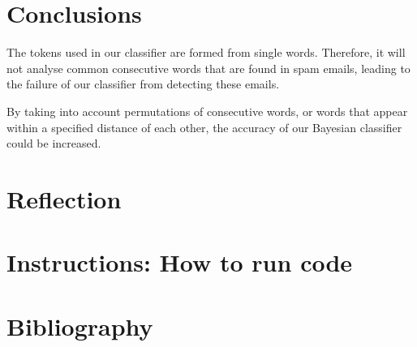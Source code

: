 \documentclass[10pt, a4paper]{article}
\begin{document}
\section{Conclusions}

The tokens used in our classifier are formed from single words. Therefore, it will not analyse common consecutive words that are found in spam emails, leading to the failure of our classifier from detecting these emails.

By taking into account permutations of consecutive words, or words that appear within a specified distance of each other, the accuracy of our Bayesian classifier could be increased.

\section{Reflection}

\section{Instructions: How to run code}

\section{Bibliography}
\end{document}
